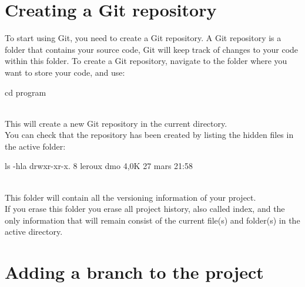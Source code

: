 \section{Creating a Git repository}

To start using Git, you need to create a Git repository. 
A Git repository is a folder that contains your source code, Git will keep track of changes to your code within this folder. 
To create a Git repository, navigate to the folder where you want to store your code, and use:
\begin{script}
\fprompt{~} cd program
  
\end{script}
\\[-0.25cm]
\noindent This will create a new Git repository in the current directory. \\
You can check that the repository has been created by listing the hidden files in the active folder: 
\begin{script}
 ls -hla 
drwxr-xr-x.  8 leroux dmo 4,0K 27 mars  21:58 
\end{script}
\\
\noindent This  folder will contain all the versioning information of your project. \\
If you erase this folder you erase all project history, also called index, 
and the only information that will remain consist of the current file(s) and folder(s) in the active directory. 

\section{Adding a branch to the project}

